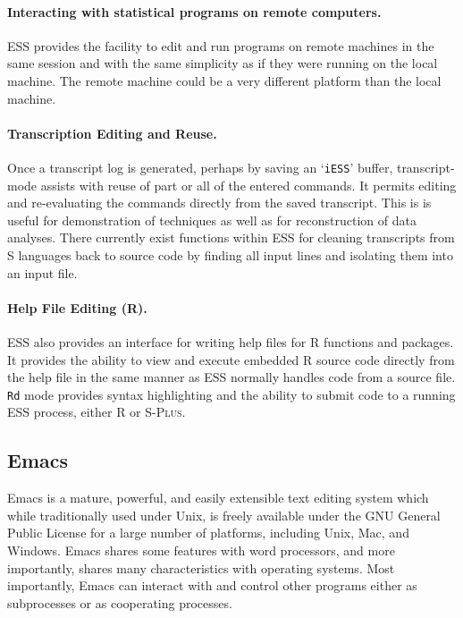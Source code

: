 \documentclass{article}
\newcommand*{\Splus}{\textsc{S-Plus}}
\newcommand{\stexttt}[1]{{\small\texttt{#1}}}
\newcommand{\file}[1]{`\stexttt{#1}'}
\begin{document}
\paragraph{Interacting with statistical programs on remote computers.}
ESS provides the facility to edit and run programs on remote machines
in the same session and with the same simplicity as if they were
running on the local machine.  The remote machine could be a very
different platform than the local machine.

\paragraph{Transcription Editing and Reuse.}
Once a transcript log is generated, perhaps by saving an \file{iESS}
buffer, transcript-mode assists with reuse of part or all of the
entered commands.  It permits editing and re-evaluating the commands
directly from the saved transcript.  This is is useful for
demonstration of techniques as well as for reconstruction of data
analyses.  There currently exist functions within ESS for cleaning
transcripts from S languages back to source code by finding all input
lines and isolating them into an input file.

\paragraph{Help File Editing (R).}
ESS also provides an interface for writing help files for R functions
and packages.  It provides the ability to view and execute embedded R
source code directly from the help file in the same manner as ESS
normally handles code from a source file.  \stexttt{Rd} mode provides
syntax highlighting and the ability to submit code to a running ESS
process, either R or \Splus.

\subsection{Emacs}
\label{sec:ESS:emacs}

Emacs \citep{RMS:2000} is a mature, powerful, and easily extensible
text editing system which while traditionally used under Unix, is
freely available under the GNU General Public License for a large
number of platforms, including Unix, Mac, and
Windows.  Emacs shares some features with word
processors, and more importantly, shares many characteristics with
operating systems.  Most importantly, Emacs can interact with and
control other programs either as subprocesses or as cooperating
processes.
\end{document}
